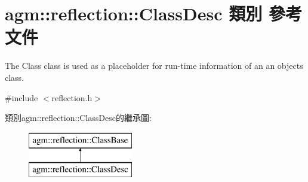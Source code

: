 \hypertarget{classagm_1_1reflection_1_1_class_desc}{}\section{agm\+:\+:reflection\+:\+:Class\+Desc 類別 參考文件}
\label{classagm_1_1reflection_1_1_class_desc}


The Class class is used as a placeholder for run-\/time information of an an object\textquotesingle{}s class.  




{\ttfamily \#include $<$reflection.\+h$>$}

類別agm\+:\+:reflection\+:\+:Class\+Desc的繼承圖\+:\begin{figure}[H]
\begin{center}
\leavevmode
\includegraphics[height=2.000000cm]{classagm_1_1reflection_1_1_class_desc}
\end{center}
\end{figure}
